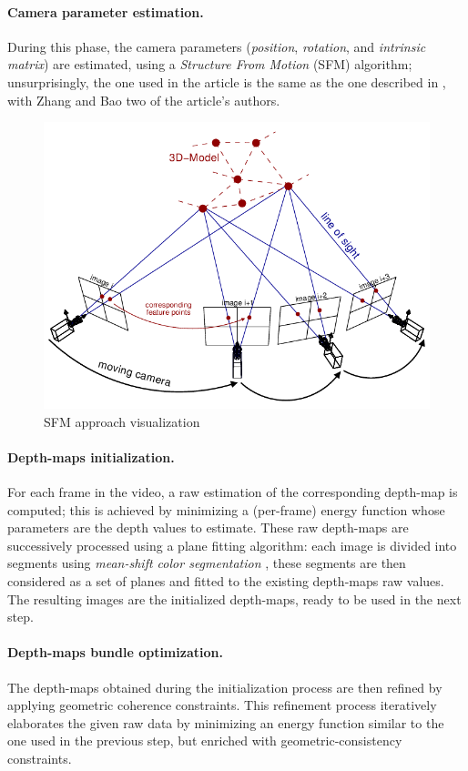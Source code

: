 \documentclass[notitlepage,english]{hgbreport}
\begin{document}
\paragraph{Camera parameter estimation.} During this phase, the camera parameters (\ie \emph{position}, \emph{rotation}, and \emph{intrinsic matrix}) are estimated, using a \emph{Structure From Motion} (SFM) algorithm; unsurprisingly, the one used in the article is the same as the one described in \cite{Zhang2007}, with Zhang and Bao two of the article's authors.
\begin{figure}[!h]
	\centering
	\includegraphics[width=.75\textwidth]{sfm.png} %
	\caption{SFM approach visualization}
\end{figure}

\paragraph{Depth-maps initialization.} 
For each frame in the video, a raw estimation of the corresponding depth-map is computed; this is achieved by minimizing a (per-frame) energy function whose parameters are the depth values to estimate.
These raw depth-maps are successively processed using a plane fitting algorithm: each image is divided into segments using \emph{mean-shift color segmentation} \cite{Comaniciu202}, these segments are then considered as a set of planes and fitted to the existing depth-maps raw values. The resulting images are the initialized depth-maps, ready to be used in the next step.

\paragraph{Depth-maps bundle optimization.} The depth-maps obtained during the initialization process are then refined by applying geometric coherence constraints. This refinement process iteratively elaborates the given raw data by minimizing an energy function similar to the one used in the previous step, but enriched with geometric-consistency constraints.
\end{document}
